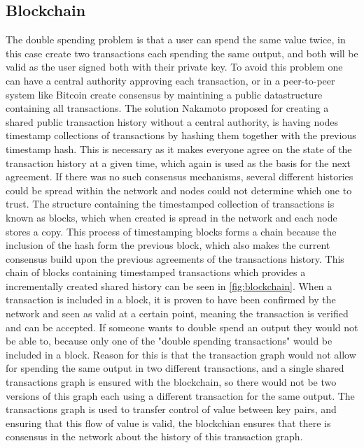 \subsection{Blockchain}
\label{subsec:blockchain}

The double spending problem is that a user can spend the same value twice, in this case create two transactions each spending the same output, and both will be valid as the user signed both with their private key. To avoid this problem one can have a central authority approving each transaction, or in a peer-to-peer system like Bitcoin create consensus by maintining a public datastructure containing all transactions. The solution Nakamoto \cite{nakamoto2008bitcoin} proposed for creating a shared public transaction history without a central authority, is having nodes timestamp collections of transactions by hashing them together with the previous timestamp hash. This is necessary as it makes everyone agree on the state of the transaction history at a given time, which again is used as the basis for the next agreement. If there was no such consensus mechanisms, several different histories could be spread within the network and nodes could not determine which one to trust.
The structure containing the timestamped collection of transactions is known as blocks, which when created is spread in the network and each node stores a copy. 
This process of timestamping blocks forms a chain because the inclusion of the hash form the previous block, which also makes the current consensus build upon the previous agreements of the transactions history. This chain of blocks containing timestamped transactions which provides a incrementally created shared history can be seen in \cref{fig:blockchain}. When a transaction is included in a block, it is proven to have been confirmed by the network and seen as valid at a certain point, meaning the transaction is verified and can be accepted. If someone wants to double spend an output they would not be able to, because only one of the "double spending transactions" would be included in a block. Reason for this is that the transaction graph would not allow for spending the same output in two different transactions, and a single shared transactions graph is ensured with the blockchain, so there would not be two versions of this graph each using a different transaction for the same output. The transactions graph is used to transfer control of value between key pairs, and ensuring that this flow of value is valid, the blockchian ensures that there is consensus in the network about the history of this transaction graph.

